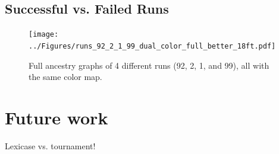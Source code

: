 \documentclass{sig-alternate}
\begin{document}

\subsection{Successful vs. Failed Runs}

\begin{figure}[tb]
	\begin{center}
		\texttt{[image: ../Figures/runs\_92\_2\_1\_99\_dual\_color\_full\_better\_18ft.pdf]}
	\end{center}
	\caption{Full ancestry graphs of 4 different runs (92, 2, 1, and 99), all with the same color map.}
	\label{fig:runs92:2:1:99:filtered}
\end{figure}

\section{Future work}
\label{sec:futurework}

Lexicase vs. tournament!





\end{document}
